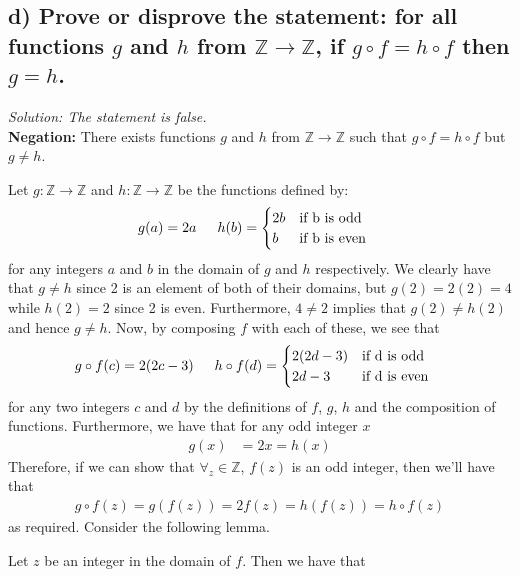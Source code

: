 \documentclass[11pt, letterpaper]{article}
\begin{document}
\subsection*{d) Prove or disprove the statement: for all functions $g$ and $h$ from $\mathbb{Z}\rightarrow\mathbb{Z}$, if $g\circ f=h\circ f$ then $g=h$.}
{\large\it Solution: The statement is false.}\\[0.25cm]
{\bf Negation:} There exists functions $g$ and $h$ from $\mathbb{Z}\rightarrow\mathbb{Z}$ such that $g\circ f=h\circ f$ but $g\neq h$.
\begin{prf}
    Let $g:\mathbb{Z}\rightarrow\mathbb{Z}$ and $h:\mathbb{Z}\rightarrow\mathbb{Z}$ be the functions defined by:
    \begin{align*}
        g(a)=2a \indent &h(b)=\begin{cases}
            2b &\text{if b is odd}\\
            b &\text{if b is even}
        \end{cases}
    \end{align*}
    for any integers $a$ and $b$ in the domain of $g$ and $h$ respectively. We clearly have that $g\neq h$ since 2 is an element of both of their domains, but $g(2)=2(2)=4$ while $h(2)=2$ since 2 is even. Furthermore, $4\neq 2$ implies that $g(2)\neq h(2)$ and hence $g\neq h$.
    Now, by composing $f$ with each of these, we see that
    \begin{align*}
        g\circ f(c)=2(2c-3) \indent &h\circ f(d)=\begin{cases}
            2(2d-3) &\text{if d is odd}\\
            2d-3 &\text{if d is even}
        \end{cases}
    \end{align*}
    for any two integers $c$ and $d$ by the definitions of $f$, $g$, $h$ and the composition of functions. Furthermore, we have that for any odd integer $x$
    \begin{align*}
        g(x)&=2x=h(x)
    \end{align*}
    Therefore, if we can show that $\forall_z\in\mathbb{Z}$, $f(z)$ is an odd integer, then we'll have that
    \begin{align*}
        g\circ f(z)=g(f(z))=2f(z)=h(f(z))=h\circ f(z)
    \end{align*}
    as required. Consider the following lemma.\\
    \begin{lemma}
        Let $z$ be an integer in the domain of $f$. Then we have that

\end{lemma}
\end{prf}
\end{document}
